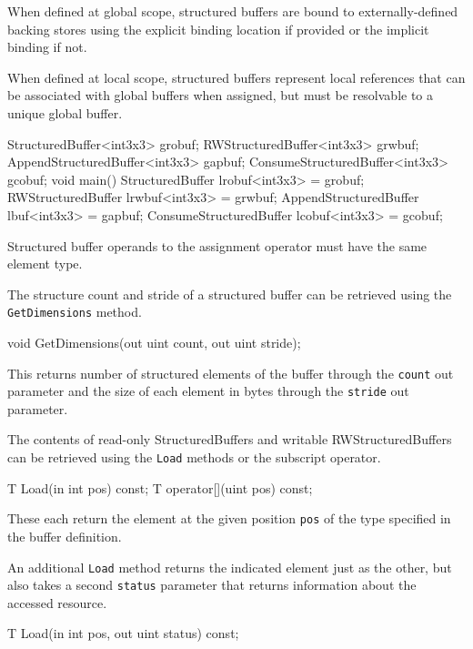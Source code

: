 When defined at global scope, structured buffers are bound to externally-defined backing stores
using the explicit binding location if provided or the implicit binding if not.

When defined at local scope, structured buffers represent local references
that can be associated with global buffers when assigned,
but must be resolvable to a unique global buffer.

\begin{HLSL}
  StructuredBuffer<int3x3> grobuf;
  RWStructuredBuffer<int3x3> grwbuf;
  AppendStructuredBuffer<int3x3> gapbuf;
  ConsumeStructuredBuffer<int3x3> gcobuf;
  void main() {
    StructuredBuffer lrobuf<int3x3> = grobuf;
    RWStructuredBuffer lrwbuf<int3x3> = grwbuf;
    AppendStructuredBuffer lbuf<int3x3> = gapbuf;
    ConsumeStructuredBuffer lcobuf<int3x3> = gcobuf;
  }
\end{HLSL}
Structured buffer operands to the assignment operator must have the same element type.


The structure count and stride of a structured buffer can be retrieved using the \texttt{GetDimensions} method.
\begin{HLSL}
void GetDimensions(out uint count, out uint stride);
\end{HLSL}

This returns number of structured elements of the buffer through the \texttt{count} out parameter
and the size of each element in bytes through the \texttt{stride} out parameter.


The contents of read-only StructuredBuffers and writable RWStructuredBuffers can be retrieved
using the \texttt{Load} methods or the subscript operator.

\begin{HLSL}
 T Load(in int pos) const;
 T operator[](uint pos) const;
\end{HLSL}

These each return the element at the given position \texttt{pos} of the type specified in the buffer definition.

An additional \texttt{Load} method returns the indicated element just as the other,
but also takes a second \texttt{status} parameter that returns information about the accessed resource.
\begin{HLSL}
 T Load(in int pos, out uint status) const;
\end{HLSL}

